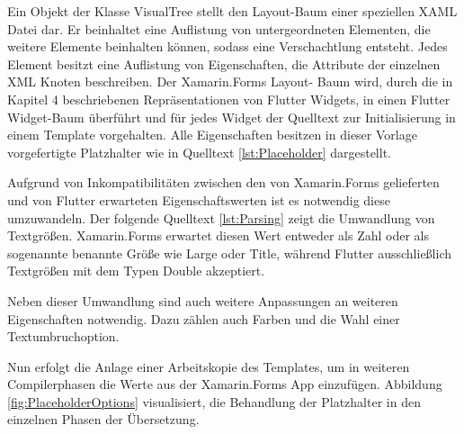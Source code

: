 Ein Objekt der Klasse VisualTree stellt den Layout-Baum einer speziellen XAML Datei dar.  Er beinhaltet eine Auflistung von untergeordneten Elementen,  die weitere Elemente beinhalten können,  sodass eine Verschachtlung entsteht.  Jedes Element besitzt eine Auflistung von Eigenschaften, die Attribute der einzelnen XML Knoten beschreiben.  Der Xamarin.Forms Layout- Baum wird,  durch die in Kapitel 4 beschriebenen Repräsentationen von Flutter Widgets, in einen Flutter Widget-Baum überführt und für jedes Widget der Quelltext zur Initialisierung in einem Template vorgehalten.  Alle Eigenschaften besitzen in dieser Vorlage vorgefertigte Platzhalter wie in Quelltext \ref{lst:Placeholder} dargestellt.

 

Aufgrund von Inkompatibilitäten zwischen den von Xamarin.Forms gelieferten und von Flutter erwarteten Eigenschaftswerten ist es notwendig diese umzuwandeln.  Der folgende Quelltext \ref{lst:Parsing} zeigt die Umwandlung von Textgrößen.  Xamarin.Forms erwartet diesen Wert entweder als Zahl oder als sogenannte benannte Größe wie Large oder Title,  während Flutter ausschließlich Textgrößen mit dem Typen Double akzeptiert.   

 

Neben dieser Umwandlung sind auch weitere Anpassungen an weiteren Eigenschaften notwendig.  Dazu zählen auch Farben und die Wahl einer Textumbruchoption.

Nun erfolgt die Anlage einer Arbeitskopie des Templates,  um in weiteren Compilerphasen die Werte aus der Xamarin.Forms App einzufügen.  Abbildung \ref{fig:PlaceholderOptions} visualisiert, die Behandlung der Platzhalter in den einzelnen Phasen der Übersetzung.

